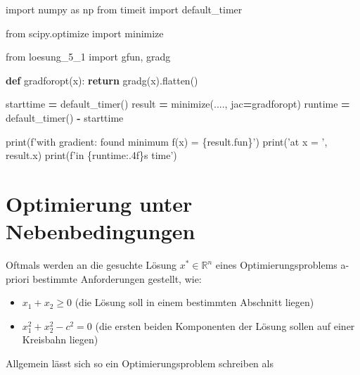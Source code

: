 \documentclass[]{book}
\newenvironment{Shaded}{\begin{snugshade}}{\end{snugshade}}
\newcommand{\BuiltInTok}[1]{#1}
\newcommand{\ControlFlowTok}[1]{\textcolor[rgb]{0.13,0.29,0.53}{\textbf{#1}}}
\newcommand{\ImportTok}[1]{#1}
\newcommand{\KeywordTok}[1]{\textcolor[rgb]{0.13,0.29,0.53}{\textbf{#1}}}
\newcommand{\NormalTok}[1]{#1}
\newcommand{\OperatorTok}[1]{\textcolor[rgb]{0.81,0.36,0.00}{\textbf{#1}}}
\newcommand{\SpecialCharTok}[1]{\textcolor[rgb]{0.00,0.00,0.00}{#1}}
\newcommand{\SpecialStringTok}[1]{\textcolor[rgb]{0.31,0.60,0.02}{#1}}
\newcommand{\StringTok}[1]{\textcolor[rgb]{0.31,0.60,0.02}{#1}}
\providecommand{\tightlist}{%
  \setlength{\itemsep}{0pt}\setlength{\parskip}{0pt}}
\theoremstyle{definition}
\theoremstyle{definition}
\theoremstyle{definition}
\theoremstyle{definition}
\theoremstyle{remark}
\begin{document}
\begin{Shaded}
\begin{Highlighting}[]
\ImportTok{import}\NormalTok{ numpy }\ImportTok{as}\NormalTok{ np}
\ImportTok{from}\NormalTok{ timeit }\ImportTok{import}\NormalTok{ default_timer}

\ImportTok{from}\NormalTok{ scipy.optimize }\ImportTok{import}\NormalTok{ minimize}

\ImportTok{from}\NormalTok{ loesung_5_1 }\ImportTok{import}\NormalTok{ gfun, gradg}


\KeywordTok{def}\NormalTok{ gradforopt(x):}
    \ControlFlowTok{return}\NormalTok{ gradg(x).flatten()}


\NormalTok{starttime }\OperatorTok{=}\NormalTok{ default_timer()}
\NormalTok{result }\OperatorTok{=}\NormalTok{ minimize(...., jac}\OperatorTok{=}\NormalTok{gradforopt)}
\NormalTok{runtime }\OperatorTok{=}\NormalTok{ default_timer() }\OperatorTok{-}\NormalTok{ starttime}

\BuiltInTok{print}\NormalTok{(}\SpecialStringTok{f'with gradient: found minimum f(x) = }\SpecialCharTok{\{}\NormalTok{result}\SpecialCharTok{.}\NormalTok{fun}\SpecialCharTok{\}}\SpecialStringTok{'}\NormalTok{)}
\BuiltInTok{print}\NormalTok{(}\StringTok{'at x = '}\NormalTok{, result.x)}
\BuiltInTok{print}\NormalTok{(}\SpecialStringTok{f'in }\SpecialCharTok{\{}\NormalTok{runtime}\SpecialCharTok{:.4f\}}\SpecialStringTok{s time'}\NormalTok{)}
\end{Highlighting}
\end{Shaded}

\hypertarget{optimierung-unter-nebenbedingungen}{%
\chapter{Optimierung unter Nebenbedingungen}\label{optimierung-unter-nebenbedingungen}}

Oftmals werden an die gesuchte Lösung \(x^* \in \mathbb R^{n}\) eines Optimierungsproblems a-priori bestimmte Anforderungen gestellt, wie:

\begin{itemize}
\tightlist
\item
  \(x_1 + x_2 \geq 0\) (die Lösung soll in einem bestimmten Abschnitt liegen)
\item
  \(x_1^2 + x_2^2 - c^2 = 0\) (die ersten beiden Komponenten der Lösung sollen auf einer Kreisbahn liegen)
\end{itemize}

Allgemein lässt sich so ein Optimierungsproblem schreiben als
\end{document}
